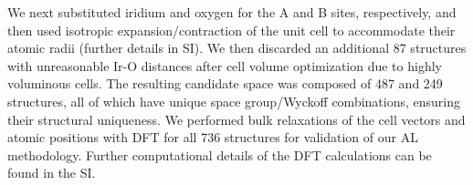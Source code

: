 We next substituted iridium and oxygen for the A and B sites, respectively,
and then used isotropic expansion/contraction of the unit cell to accommodate their atomic radii (further details in SI).  We then discarded an additional 87 structures with unreasonable Ir-O distances after cell volume optimization due to highly voluminous cells.
%
%
%
%
The resulting candidate space was composed of \num{487} \IrOtwo and \num{249} \IrOthree structures, all of which have unique space group/Wyckoff combinations, ensuring their structural uniqueness.
We performed bulk relaxations of the cell vectors and atomic positions with DFT for all \num{736} structures for validation of our AL methodology. Further computational details of the DFT calculations can be found in the SI.
%
%

